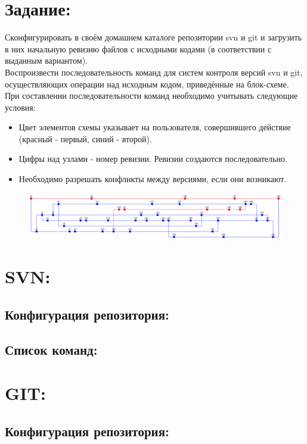 \tableofcontents

\newpage

\section{Задание:}
Сконфигурировать в своём домашнем каталоге репозитории svn и git и загрузить в них начальную ревизию файлов с исходными
кодами (в соответствии с выданным вариантом).\\
Воспроизвести последовательность команд для систем контроля версий svn и git, осуществляющих операции над исходным кодом,
приведённые на блок-схеме.\\
При составлении последовательности команд необходимо учитывать следующие условия:
\begin{itemize}
    \item Цвет элементов схемы указывает на пользователя, совершившего действие (красный - первый, синий - второй).
    \item Цифры над узлами - номер ревизии. Ревизии создаются последовательно.
    \item Необходимо разрешать конфликты между версиями, если они возникают.
\end{itemize}

\begin{figure}[H]
    \centering
    \includegraphics[scale=1.3]{img/scheme}
\end{figure}

\section{SVN:}
\subsection{Конфигурация репозитория:}

\subsection{Список команд:}

\section{GIT:}
\subsection{Конфигурация репозитория:}

